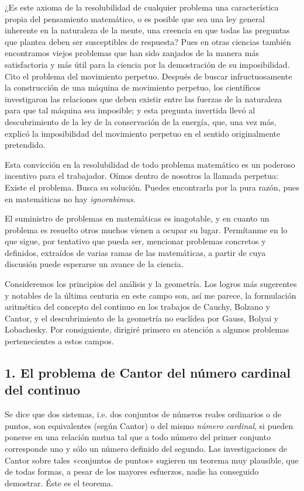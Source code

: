 \documentclass[a4paper, 12pt]{article}
\begin{document}
¿Es este axioma de la resolubilidad de cualquier problema una característica propia del pensamiento matemático, o es posible que sea una ley general inherente en la naturaleza de la mente, una creencia en que todas las preguntas que plantea deben ser susceptibles de respuesta? Pues en otras ciencias también encontramos viejos problemas que han sido zanjados de la manera más satisfactoria y más útil para la ciencia por la demostración de su imposibilidad. Cito el problema del movimiento perpetuo. Después de buscar infructuosamente la construcción de una máquina de movimiento perpetuo, los científicos investigaron las relaciones que deben existir entre las fuerzas de la naturaleza para que tal máquina sea imposible; y esta pregunta invertida llevó al descubrimiento de la ley de la conservación de la energía, que, una vez más, explicó la imposibilidad del movimiento perpetuo en el sentido originalmente pretendido. 

Esta convicción en la resolubilidad de todo problema matemático es un poderoso incentivo para el trabajador. Oímos dentro de nosotros la llamada perpetua: Existe el problema. Busca su solución. Puedes encontrarla por la pura razón, pues en matemáticas no hay \textit{ignorabimus}. 

El suministro de problemas en matemáticas es inagotable, y en cuanto un problema es resuelto otros muchos vienen a ocupar su lugar. Permítanme en lo que sigue, por tentativo que pueda ser, mencionar problemas concretos y definidos, extraídos de varias ramas de las matemáticas, a partir de cuya discusión puede esperarse un avance de la ciencia. 

Consideremos los principios del análisis y la geometría. Los logros más sugerentes y notables de la última centuria en este campo son, así me parece, la formulación aritmética del concepto del continuo en los trabajos de Cauchy, Bolzano y Cantor, y el descubrimiento de la geometría no euclídea por Gauss, Bolyai y Lobachesky. Por consiguiente, dirigiré primero su atención a algunos problemas pertenecientes a estos campos. 



\subsection*{1. El problema de Cantor del número cardinal del continuo }

Se dice que dos sistemas, i.e. dos conjuntos de números reales ordinarios o de puntos, son equivalentes (según Cantor) o del mismo \textit{número cardinal}, si pueden ponerse en una relación mutua tal que a todo número del primer conjunto corresponde uno y sólo un número definido del segundo. Las investigaciones de Cantor sobre tales «conjuntos de  puntos» sugieren un teorema muy plausible, que de todas formas, a pesar de los mayores esfuerzos, nadie ha conseguido demostrar. Éste es el teorema. 
\end{document}
